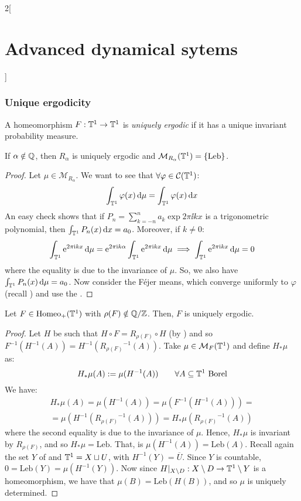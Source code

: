 \documentclass[../../../main_math.tex]{subfiles}
\begin{document}
\begin{multicols}{2}[\section{Advanced dynamical sytems}]
  \subsubsection{Unique ergodicity}
  \begin{definition}
    A homeomorphism $F:\mathbb{T}^1\to\mathbb{T}^1$ is \emph{uniquely ergodic} if it has a unique invariant probability measure.
  \end{definition}
  \begin{lemma}
    If $\alpha\notin \mathbb{Q}$, then $R_\alpha$ is uniquely ergodic and $\mathcal{M}_{R_\alpha}(\mathbb{T}^1)=\{\text{Leb}\}$.
  \end{lemma}
  \begin{proof}
    Let $\mu\in\mathcal{M}_{R_\alpha}$. We want to see that $\forall \varphi\in \mathcal{C}(\mathbb{T}^1)$:
    $$
      \int_{\mathbb{T}^1}\varphi(x)\dd{\mu}=\int_{\mathbb{T}^1}\varphi(x)\dd{x}
    $$
    An easy check shows that if $P_n=\sum_{k=-n}^na_k\exp{2\pi\ii k x}$ is a trigonometric polynomial, then $\int_{\mathbb{T}^1}P_n(x)\dd{x}=a_0$. Moreover, if $k\ne 0$:
    $$
      \int_{\mathbb{T}^1}\mathrm{e}^{2\pi\mathrm{i} kx}\dd{\mu}=\mathrm{e}^{2\pi\mathrm{i} k\alpha}\int_{\mathbb{T}^1}\mathrm{e}^{2\pi\mathrm{i} kx}\dd{\mu}\implies \int_{\mathbb{T}^1}\mathrm{e}^{2\pi\mathrm{i} kx}\dd{\mu}=0
    $$
    where the equality is due to the invariance of $\mu$. So, we also have $\int_{\mathbb{T}^1}P_n(x)\dd{\mu}=a_0$. Now consider the Féjer means, which converge uniformly to $\varphi$ (recall ) and use the .
  \end{proof}
  \begin{proposition}\label{ADS:uniquely_ergodic}
    Let $F\in\mathrm{Homeo}_+(\mathbb{T}^1)$ with $\rho(F)\notin\quot{\QQ}{\ZZ}$. Then, $F$ is uniquely ergodic.
  \end{proposition}
  \begin{proof}
    Let $H$ be such that $H\circ F=R_{\rho(F)}\circ H$ (by ) and so $F^{-1}(H^{-1}(A))=H^{-1}({R_{\rho(F)}}^{-1}(A))$. Take $\mu\in\mathcal{M}_F(\mathbb{T}^1)$ and define $H_*\mu$ as:
    $$
      H_*\mu(A):=\mu(H^{-1}(A))\qquad \forall A\subseteq \mathbb{T}^1\text{ Borel}
    $$
    We have:
    \begin{multline*}
      H_*\mu(A)=\mu(H^{-1}(A))=\mu(F^{-1}(H^{-1}(A)))=\\=\mu(H^{-1}({R_{\rho(F)}}^{-1}(A)))=H_*\mu({R_{\rho(F)}}^{-1}(A))
    \end{multline*}
    where the second equality is due to the invariance of $\mu$. Hence, $H_*\mu$ is invariant by $R_{\rho(F)}$, and so $H_*\mu=\text{Leb}$. That, is $\mu(H^{-1}(A))=\text{Leb}(A)$. Recall again the set $Y$ of  and $\mathbb{T}^1=X\sqcup U$, with $H^{-1}(Y)=\overline{U}$. Since $Y$ is countable, $0=\text{Leb}(Y)=\mu(H^{-1}(Y))$. Now since $H|_{X\setminus D}:X\setminus D\to \mathbb{T}^1\setminus Y$ is a homeomorphism, we have that $\mu(B)=\text{Leb}(H(B))$, and so $\mu$ is uniquely determined.

\end{proof}
\end{multicols}
\end{document}
